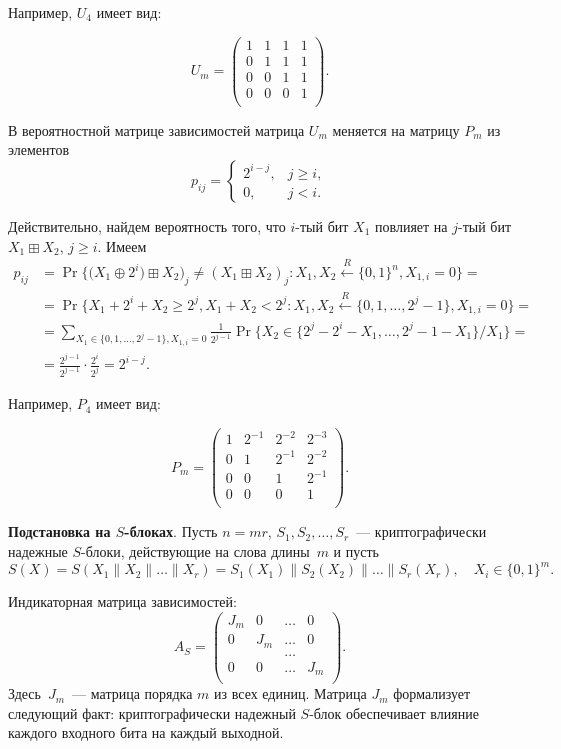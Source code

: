 \documentclass[a4paper,12pt]{report}
\theoremstyle{plain} %
\theoremstyle{definition}
\theoremstyle{remark}
\begin{document}
\begin{large}
Например, $U_4$ имеет вид:

$$
U_m = 
\begin{pmatrix} 
1 & 1 & 1 & 1\\ 
0 & 1 & 1 & 1\\ 
0 & 0 & 1 & 1\\
0 & 0 & 0 & 1\\
\end{pmatrix}.
$$

В вероятностной матрице зависимостей матрица 
$U_m$ меняется на матрицу $P_m$ из элементов 
$$
p_{ij}=\begin{cases}
2^{i-j}, & j\geq i,\\
0,       & j< i.
\end{cases}
$$

Действительно,
найдем вероятность того, что $i$-тый бит $X_1$ повлияет на $j$-тый бит
$X_1\boxplus X_2$, $j\geq i$.
Имеем
\begin{align*}
p_{ij}
&= 
\Pr\bigg\{\big(X_1 \oplus 2^i)\boxplus X_2\big)_j \neq (X_1 \boxplus X_2)_j\colon
X_1, X_2\stackrel{R}\leftarrow \{0,1\}^n, X_{1,i} = 0\bigg\} =\\
&=
\Pr\bigg\{X_1+2^i+X_2\geq 2^j, X_1 + X_2 < 2^j\colon 
X_1, X_2\stackrel{R}\leftarrow\{0,1,\ldots,2^j-1\}, X_{1,i} = 0\bigg\}=\\
&=
\sum_{X_1\in \{0,1,\ldots,2^j-1\}, X_{1,i}=0}
\frac{1}{2^{j-1}}\Pr\bigg\{X_2 \in \{2^j-2^i-X_1,\ldots,2^j-1-X_1\}/X_1\bigg\} =\\
&=
\frac{2^{j-1}}{2^{j-1}}\cdot \frac{2^i}{2^j} = 2^{i-j}.
\end{align*}

Например, $P_4$ имеет вид:

$$
P_m = 
\begin{pmatrix} 
1 & 2^{-1} & 2^{-2} & 2^{-3}\\ 
0 & 1 & 2^{-1} & 2^{-2}\\ 
0 & 0 & 1 & 2^{-1}\\
0 & 0 & 0 & 1\\
\end{pmatrix}.
$$

{\bf Подстановка на $S$-блоках}.
Пусть $n=mr$, $S_1,S_2,\ldots,S_r$~---
криптографически надежные $S$-блоки,
действующие на слова длины~$m$ и 
пусть 
$$
S(X)=S(X_1\parallel X_2\parallel\ldots\parallel X_r)=
S_1(X_1)\parallel S_2(X_2)\parallel\ldots\parallel S_r(X_r),\quad
X_i\in\{0,1\}^m.
$$

Индикаторная матрица зависимостей:
$$
A_S = 
\begin{pmatrix} 
J_m & 0 & \ldots & 0\\ 
0 & J_m & \ldots & 0\\
  &     & \ldots &\\
0 &  0  & \ldots & J_m\\
\end{pmatrix}.
$$
Здесь~$J_m$~--- матрица порядка $m$ из всех единиц.
Матрица $J_m$ формализует следующий факт: 
криптографически надежный $S$-блок обеспечивает 
влияние каждого входного бита на каждый выходной.


\end{large}
\end{document}
